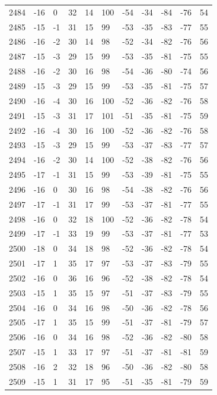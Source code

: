 \begin{table}[H]
\begin{tabular}{lllllllllll}
2484 & -16 & 0 & 32 & 14 & 100 & -54 & -34 & -84 & -76 & 54 \\
2485 & -15 & -1 & 31 & 15 & 99 & -53 & -35 & -83 & -77 & 55 \\
2486 & -16 & -2 & 30 & 14 & 98 & -52 & -34 & -82 & -76 & 56 \\
2487 & -15 & -3 & 29 & 15 & 99 & -53 & -35 & -81 & -75 & 55 \\
2488 & -16 & -2 & 30 & 16 & 98 & -54 & -36 & -80 & -74 & 56 \\
2489 & -15 & -3 & 29 & 15 & 99 & -53 & -35 & -81 & -75 & 57 \\
2490 & -16 & -4 & 30 & 16 & 100 & -52 & -36 & -82 & -76 & 58 \\
2491 & -15 & -3 & 31 & 17 & 101 & -51 & -35 & -81 & -75 & 59 \\
2492 & -16 & -4 & 30 & 16 & 100 & -52 & -36 & -82 & -76 & 58 \\
2493 & -15 & -3 & 29 & 15 & 99 & -53 & -37 & -83 & -77 & 57 \\
2494 & -16 & -2 & 30 & 14 & 100 & -52 & -38 & -82 & -76 & 56 \\
2495 & -17 & -1 & 31 & 15 & 99 & -53 & -39 & -81 & -75 & 55 \\
2496 & -16 & 0 & 30 & 16 & 98 & -54 & -38 & -82 & -76 & 56 \\
2497 & -17 & -1 & 31 & 17 & 99 & -53 & -37 & -81 & -77 & 55 \\
2498 & -16 & 0 & 32 & 18 & 100 & -52 & -36 & -82 & -78 & 54 \\
2499 & -17 & -1 & 33 & 19 & 99 & -53 & -37 & -81 & -77 & 53 \\
2500 & -18 & 0 & 34 & 18 & 98 & -52 & -36 & -82 & -78 & 54 \\
2501 & -17 & 1 & 35 & 17 & 97 & -53 & -37 & -83 & -79 & 55 \\
2502 & -16 & 0 & 36 & 16 & 96 & -52 & -38 & -82 & -78 & 54 \\
2503 & -15 & 1 & 35 & 15 & 97 & -51 & -37 & -83 & -79 & 55 \\
2504 & -16 & 0 & 34 & 16 & 98 & -50 & -36 & -82 & -78 & 56 \\
2505 & -17 & 1 & 35 & 15 & 99 & -51 & -37 & -81 & -79 & 57 \\
2506 & -16 & 0 & 34 & 16 & 98 & -52 & -36 & -82 & -80 & 58 \\
2507 & -15 & 1 & 33 & 17 & 97 & -51 & -37 & -81 & -81 & 59 \\
2508 & -16 & 2 & 32 & 18 & 96 & -50 & -36 & -82 & -80 & 58 \\
2509 & -15 & 1 & 31 & 17 & 95 & -51 & -35 & -81 & -79 & 59 \\

\end{tabular}
\end{table}
